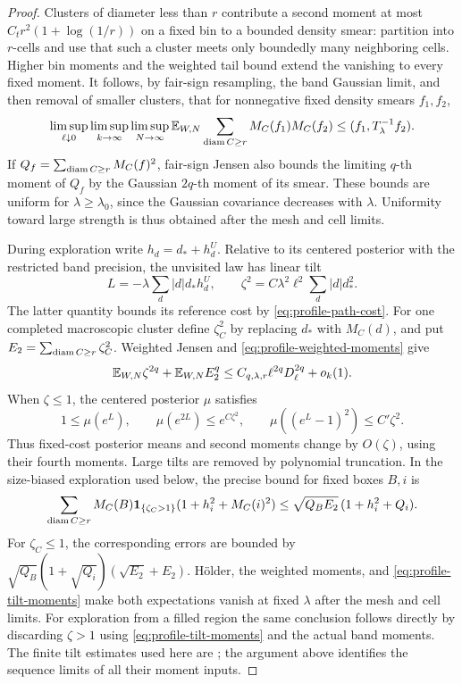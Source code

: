 \begin{proof}
Clusters of diameter less than \(r\) contribute a second moment at
most \(C_t r^2(1+\log(1/r))\) on a fixed bin to a bounded density
smear: partition into \(r\)-cells and use that such a cluster meets
only boundedly many neighboring cells.  Higher bin moments and the
weighted tail bound extend the vanishing to every fixed moment.
It follows, by fair-sign resampling, the band Gaussian limit, and
then removal of smaller clusters, that for nonnegative fixed
density smears \(f_1,f_2\),
\begin{equation}\label{eq:profile-cluster-cross}
 \limsup_{\ell\downarrow0}\limsup_{k\to\infty}\limsup_{N\to\infty}
 \mathbb E_{W,N}\sum_{\operatorname{diam} C\ge r}M_C(f_1)M_C(f_2)
                    \le (f_1,T_\lambda^{-1}f_2).
\end{equation}
If \(Q_f=\sum_{\operatorname{diam} C\ge r}M_C(f)^2\), fair-sign Jensen also
bounds the limiting \(q\)-th moment of \(Q_f\) by the Gaussian
\(2q\)-th moment of its smear.  These bounds are uniform for
\(\lambda\ge\lambda_0\), since the Gaussian covariance decreases
with \(\lambda\).  Uniformity toward large strength is thus obtained
after the mesh and cell limits.

During exploration write \(h_d=d_*+h_d^U\).  Relative to its centered
posterior with the restricted band precision, the unvisited law has
linear tilt
\[
 L=-\lambda\sum_d|d|d_*h_d^U,\qquad
 \zeta^2=C\lambda^2\ell^2\sum_d|d|d_*^2.
\]
The latter quantity bounds its reference cost by
\eqref{eq:profile-path-cost}.  For one completed macroscopic cluster
define \(\zeta_C^2\) by replacing \(d_*\) with \(M_C(d)\), and put
\(E_2=\sum_{\operatorname{diam} C\ge r}\zeta_C^2\).  Weighted Jensen and
\eqref{eq:profile-weighted-moments} give
\begin{equation}\label{eq:profile-tilt-moments}
       \mathbb E_{W,N}\zeta^{2q}+\mathbb E_{W,N}E_2^q
        \le C_{q,\lambda,r}\ell^{2q}D_\ell^{2q}+o_k(1).
\end{equation}
When \(\zeta\le1\), the centered posterior \(\mu\) satisfies
\[
 1\le\mu(e^L),\qquad
 \mu(e^{2L})\le e^{C\zeta^2},\qquad
 \mu((e^L-1)^2)\le C'\zeta^2.
\]
Thus fixed-cost posterior means and second moments change by
\(O(\zeta)\), using their fourth moments.  Large tilts are removed by
polynomial truncation.  In the size-biased exploration used below,
the precise bound for fixed boxes \(B,i\) is
\begin{equation}\label{eq:profile-large-tilts}
 \sum_{\operatorname{diam} C\ge r}M_C(B)\mathbf 1_{\{\zeta_C>1\}}
       (1+h_i^2+M_C(i)^2)
       \le \sqrt{Q_BE_2}\,(1+h_i^2+Q_i).
\end{equation}
For \(\zeta_C\le1\), the corresponding errors are bounded by
\(\sqrt{Q_B}(1+\sqrt{Q_i})(\sqrt{E_2}+E_2)\).
H\"older, the weighted moments, and \eqref{eq:profile-tilt-moments}
make both expectations vanish at fixed \(\lambda\) after the mesh
and cell limits.  For exploration from a filled region the same
conclusion follows directly by discarding \(\zeta>1\) using
\eqref{eq:profile-tilt-moments} and the actual band moments.
The finite tilt estimates used here are
\cite[Equations~(3.12)--(3.14)]{X}; the argument above identifies
the sequence limits of all their moment inputs.


\end{proof}
